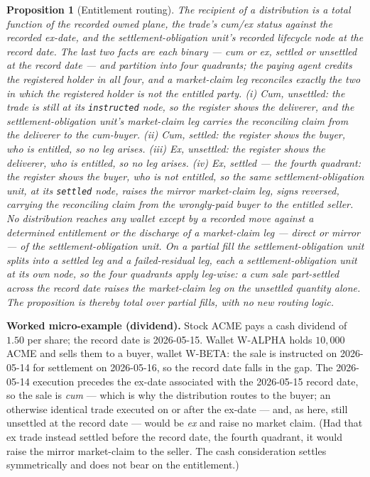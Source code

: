 \documentclass[11pt,a4paper]{article}
\newtheorem{proposition}[definition]{Proposition}
\begin{document}
\begin{proposition}[Entitlement routing]
The recipient of a distribution is a total function of the recorded owned plane, the
trade's cum/ex status against the recorded ex-date, and the settlement-obligation unit's
recorded lifecycle node at the record date. The last two facts are each binary --- cum or
ex, settled or unsettled at the record date --- and partition into four quadrants; the
paying agent credits the registered holder in all four, and a market-claim leg reconciles
exactly the two in which the registered holder is not the entitled party.
\emph{(i) Cum, unsettled:} the trade is still at its \texttt{instructed} node, so the
register shows the deliverer, and the settlement-obligation unit's market-claim leg
carries the reconciling claim from the deliverer to the cum-buyer.
\emph{(ii) Cum, settled:} the register shows the buyer, who is entitled, so no leg arises.
\emph{(iii) Ex, unsettled:} the register shows the deliverer, who is entitled, so no leg
arises.
\emph{(iv) Ex, settled --- the fourth quadrant:} the register shows the buyer, who is
\emph{not} entitled, so the same settlement-obligation unit, at its \texttt{settled} node,
raises the \emph{mirror} market-claim leg, signs reversed, carrying the reconciling claim
from the wrongly-paid buyer to the entitled seller.
No distribution reaches any wallet except by a recorded move against a determined
entitlement or the discharge of a market-claim leg --- direct or mirror --- of the
settlement-obligation unit.
On a partial fill the settlement-obligation unit splits into a settled leg and a
failed-residual leg, each a settlement-obligation unit at its own node, so the four
quadrants apply leg-wise: a cum sale part-settled across the record date raises the
market-claim leg on the unsettled quantity alone. The proposition is thereby total over
partial fills, with no new routing logic.
\end{proposition}

\medskip\noindent\textbf{Worked micro-example (dividend).} Stock ACME pays a cash
dividend of $1.50$ per share; the record date is 2026-05-15. Wallet W-ALPHA holds
$10{,}000$ ACME and sells them to a buyer, wallet W-BETA: the sale is instructed on
2026-05-14 for settlement on 2026-05-16, so the record date falls in the gap. The
2026-05-14 execution precedes the ex-date associated with the 2026-05-15 record date,
so the sale is \emph{cum} --- which is why the distribution routes to the buyer; an
otherwise identical trade executed on or after the ex-date --- and, as here, still
unsettled at the record date --- would be \emph{ex} and raise no market claim. (Had that
ex trade instead settled before the record date, the fourth quadrant, it would raise the
mirror market-claim to the seller. The cash consideration settles symmetrically and does
not bear on the entitlement.)
\end{document}

